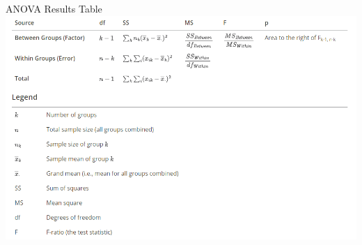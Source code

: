 \documentclass[
  ignorenonframetext,
]{beamer}
\begin{document}
\begin{frame}{ANOVA Results Table}
\label{anova-results-table}
\includegraphics{class30_files/mediabag/anova-calculation-ta.png}
\end{frame}
\end{document}
